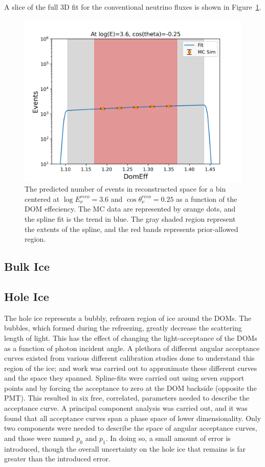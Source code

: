 \documentclass[main.tex]{subfiles}
\begin{document}
A slice of the full 3D fit for the conventional neutrino fluxes is shown in Figure~\ref{fig:domeff_fit}.
\begin{figure}
    \centering
    \includegraphics[width=0.8\linewidth]{figures/atmConv_logE_3.6_cosz_-0.25.png}
    \caption{The predicted number of events in reconstructed space for a bin centered at $\log E_{\nu}^{reco}=3.6$ and $\cos\theta_{\nu}^{reco}=0.25$ as a function of the DOM effeciency. The MC data are represented by orange dots, and the spline fit is the trend in blue. The gray shaded region represent the extents of the spline, and the red bands represents prior-allowed region.}\label{fig:domeff_fit}
\end{figure}


\subsection{Bulk Ice}

\subsection{Hole Ice}

The hole ice represents a bubbly, refrozen region of ice around the DOMs. 
The bubbles, which formed during the refreezing, greatly decrease the scattering length of light. 
This has the effect of changing the light-acceptance of the DOMs as a function of photon incident angle. 
A plethora of different angular acceptance curves existed from various different calibration studies done to understand this region of the ice; and work was carried out to approximate these different curves and the space they spanned. 
Spline-fits were carried out using seven support points and by forcing the acceptance to zero at the DOM backside (opposite the PMT). 
This resulted in six free, correlated, parameters needed to describe the acceptance curve. 
A principal component analysis was carried out, and it was found that all acceptance curves span a phase space of lower dimensionality. 
Only two components were needed to describe the space of angular acceptance curves, and those were named $p_{0}$ and $p_{1}$.
In doing so, a small amount of error is introduced, though the overall uncertainty on the hole ice that remains is far greater than the introduced error. 
\end{document}

